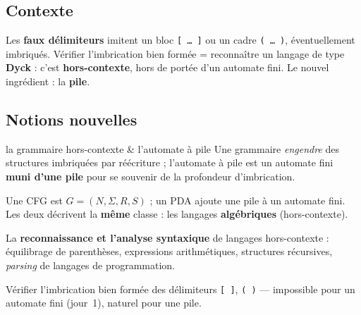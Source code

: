\documentclass[11pt,a4paper]{scrartcl}
\begin{document}
\subsection{Contexte}
Les \textbf{faux délimiteurs} imitent un bloc \texttt{[\,\dots\,]} ou un cadre
\texttt{(\,\dots\,)}, éventuellement imbriqués. Vérifier l'imbrication bien formée =
reconnaître un langage de type \textbf{Dyck} : c'est \textbf{hors-contexte}, hors de portée
d'un automate fini. Le nouvel ingrédient : la \textbf{pile}.

\subsection{Notions nouvelles}
\begin{objetformel}{la grammaire hors-contexte \& l'automate à pile}
 Une grammaire \emph{engendre} des structures imbriquées par réécriture ;
l'automate à pile est un automate fini \textbf{muni d'une pile} pour se souvenir de la
profondeur d'imbrication.

 Une CFG est $G=(N,\Sigma,R,S)$ ; un PDA ajoute une pile à un
automate fini. Les deux décrivent la \textbf{même} classe : les langages \textbf{algébriques}
(hors-contexte).

 La \textbf{reconnaissance et l'analyse syntaxique} de langages
hors-contexte : équilibrage de parenthèses, expressions arithmétiques, structures
récursives, \emph{parsing} de langages de programmation.

 Vérifier l'imbrication bien formée des délimiteurs \texttt{[\,]},
\texttt{(\,)} — impossible pour un automate fini (jour~1), naturel pour une pile.
\end{objetformel}
\end{document}
